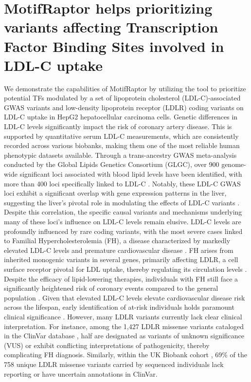 \documentclass[a4paper, titlepage, openright]{book}
\newcommand{\motifraptor}{MotifRaptor\xspace}
\begin{document}
\section{\motifraptor helps prioritizing variants affecting Transcription Factor Binding Sites involved in LDL-C uptake}
We demonstrate the capabilities of \motifraptor by utilizing the tool to prioritize potential TFs modulated by a set of lipoprotein cholesterol (LDL-C)-associated GWAS variants and low-density lipoprotein receptor (LDLR) coding variants on LDL-C uptake in HepG2 hepatocellular carcinoma cells. Genetic differences in LDL-C levels significantly impact the risk of coronary artery disease. This is supported by quantitative serum LDL-C measurements, which are consistently recorded across various biobanks, making them one of the most reliable human phenotypic datasets available. Through a trans-ancestry GWAS meta-analysis conducted by the Global Lipids Genetics Consortium (GLGC), over 900 genome-wide significant loci associated with blood lipid levels have been identified, with more than 400 loci specifically linked to LDL-C \citep{graham2021power}. Notably, these LDL-C GWAS loci exhibit a significant overlap with gene expression patterns in the liver, suggesting the liver's pivotal role in modulating the effects of LDL-C variants \citep{wang2022epic,finucane2018heritability}. Despite this correlation, the specific causal variants and mechanisms underlying many of these loci's influence on LDL-C levels remain elusive. LDL-C levels are profoundly influenced by rare coding variants, with the most severe cases linked to Familial Hypercholesterolemia (FH), a disease characterized by markedly elevated LDL-C levels and premature cardiovascular disease \citep{bouhairie2015familial}. FH arises from inherited monogenic variants in several genes, primarily affecting LDLR, a cell surface receptor pivotal for LDL uptake, thereby regulating its circulation levels \citep{brown1984ldl}. Despite the efficacy of lipid-lowering therapies, individuals with FH still face a significantly heightened risk of coronary events compared to the general population \citep{mundal2018impact}. Given that elevated LDL-C levels elevate cardiovascular disease risk across the lifespan, early identification of at-risk individuals holds paramount clinical significance \citep{bouhairie2015familial}. However, many LDLR variants currently lack clear clinical interpretation. For instance, among the 1,427 LDLR missense variants cataloged in the ClinVar database \citep{landrum2020clinvar}, half are designated as variants of unknown significance (VUS) or exhibit conflicting interpretations of pathogenicity, thereby complicating FH diagnosis. Similarly, within the UK Biobank cohort \citep{bycroft2018uk}, 69\% of the 758 unique LDLR missense variants carried by sequenced individuals lack reporting or have uncertain annotations in ClinVar. 
\end{document}
